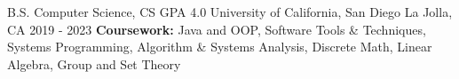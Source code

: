 
\begin{cventries}
  \cventry
    {B.S. Computer Science, CS GPA 4.0}
    {University of California, San Diego}
    {La Jolla, CA}
    {2019 - 2023}
    {
      \textbf{Coursework: } Java and OOP, Software Tools \& Techniques, Systems Programming, Algorithm \& Systems Analysis, Discrete Math, Linear Algebra, Group and Set Theory
    }
\end{cventries}
